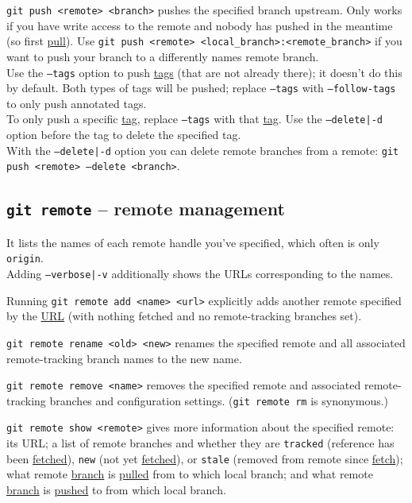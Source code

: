\documentclass[table, xcdraw]{article}%
\begin{document}
\texttt{git push <remote> <branch>} pushes the specified branch upstream. Only works if you have write access to the remote and nobody has pushed in the meantime (so first \hyperref[pull]{pull}). Use \texttt{git push <remote> <local_branch>:<remote_branch>} if you want to push your branch to a differently names remote branch.\\
Use the \texttt{--tags} option to push \hyperref[tag]{tags} (that are not already there); it doesn't do this by default. Both types of tags will be pushed; replace \texttt{--tags} with \texttt{--follow-tags} to only push annotated tags.\\
To only push a specific \hyperref[tag]{tag}, replace \texttt{--tags} with that \hyperref[tag]{tag}. Use the \texttt{--delete|-d} option before the tag to delete the specified tag.\\
With the \texttt{--delete|-d} option you can delete remote branches from a remote: \texttt{git push <remote> --delete <branch>}.

\subsection{\texttt{git remote} -- remote management} \label{remote}

It lists the names of each remote handle you've specified, which often is only \texttt{origin}.\\
Adding \texttt{--verbose|-v} additionally shows the URLs corresponding to the names.

Running \texttt{git remote add <name> <url>} explicitly adds another remote specified by the \hyperref[protocols]{URL} (with nothing fetched and no remote-tracking branches set).

\texttt{git remote rename <old> <new>} renames the specified remote and all associated remote-tracking branch names to the new name.

\texttt{git remote remove <name>} removes the specified remote and associated remote-tracking branches and configuration settings. (\texttt{git remote rm} is synonymous.)

\texttt{git remote show <remote>} gives more information about the specified remote: its URL; a list of remote branches and whether they are \texttt{tracked} (reference has been \hyperref[fetch]{fetched}), \texttt{new} (not yet \hyperref[fetch]{fetched}), or \texttt{stale} (removed from remote since \hyperref[fetch]{fetch}); what remote \hyperref[branching]{branch} is \hyperref[pull]{pulled} from to which local branch; and what remote \hyperref[branching]{branch} is \hyperref[push]{pushed} to from which local branch.
\end{document}
